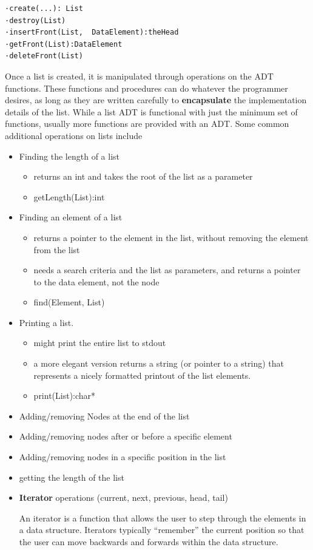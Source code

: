 \begin{lstlisting}
·create(...): List
·destroy(List)
·insertFront(List,  DataElement):theHead
·getFront(List):DataElement
·deleteFront(List)
\end{lstlisting}


 Once a list is created, it is manipulated  through operations on the ADT functions. These functions and procedures  can do whatever the programmer desires, as long as they are written  carefully to \textbf{encapsulate} the implementation details of the list.   While a list ADT is functional with just the minimum set of functions, usually more functions are provided with an ADT.  Some common additional operations on lists include
 
 \begin{itemize} 
 \item Finding the length of a list
 \begin{itemize}
\item  returns an int and takes the root of the list as a parameter
  \item getLength(List):int
  \end{itemize}
\item Finding an element of a list
 \begin{itemize}
 \item returns a  pointer to the element in the list, without removing the element from the list
\item needs a search criteria and the list as parameters, and returns a pointer to the data element, not the node

\item find(Element, List)
\end{itemize}
\item  Printing a list.
\begin{itemize}
\item might print the entire list to stdout
\item a more elegant version returns a 
             string (or pointer to a string) that represents a nicely formatted 
             printout of the list elements.
\item print(List):char*
\end{itemize}
\item Adding/removing Nodes at the end of the  list

	\item  Adding/removing nodes after or before a 
         specific element
	\item Adding/removing nodes in a specific position in the list
	\item getting the length of the list
	\item {\textbf{Iterator} operations (current, next, previous, head, tail)
	
An iterator is a function that allows the user to step through the elements in a data structure.  Iterators typically “remember” the current position so that the user can move backwards and forwards within the data structure.

}
\end{itemize}

